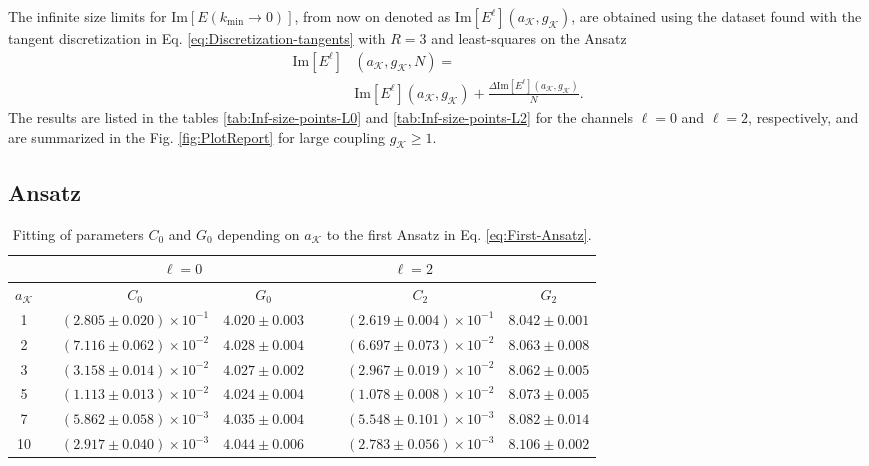 \documentclass[english,aps,prd,nofootinbib,twocolumn]{revtex4-1}
\begin{document}
The infinite size limits for $\mathrm{Im}[E(k_{\mathrm{min}}\rightarrow 0)]$, from now on denoted as $\mathrm{Im}[E^{\ell}](a_{\mathcal{K}},g_{\mathcal{K}})$, are obtained using the dataset found with the tangent discretization in Eq. \eqref{eq:Discretization-tangents} with $R=3$ and least-squares on the Ansatz 
\begin{equation}
\label{eq:Zero-Ansatz}
\begin{split}
\mathrm{Im}[E^{\ell}]&(a_{\mathcal{K}},g_{\mathcal{K}},N) = \\ 
&\mathrm{Im}[E^{\ell}](a_{\mathcal{K}},g_{\mathcal{K}}) + \frac{\Delta\mathrm{Im}[E^{\ell}](a_{\mathcal{K}},g_{\mathcal{K}})}{N}.
\end{split}
\end{equation}
The results are listed in the tables \ref{tab:Inf-size-points-L0} and \ref{tab:Inf-size-points-L2} for the channels $\ell=0$ and $\ell=2$, respectively, and are summarized in the Fig. \ref{fig:PlotReport} for large coupling $g_{\mathcal{K}}\geq 1$.

\subsection{Ansatz}
\begin{table}
\centering 
\begin{tabular}{cccccccc}
&&
\multicolumn{2}{c}{$\ell=0$} &&
\multicolumn{2}{c}{$\ell=2$}\\	\hline	\hline 
$a_{\mathcal{K}}$	&&	
$C_{0}$	&	$G_{0}$ &&&
$C_{2}$	&	$G_{2}$	\\	\hline	\hline 
1	&&	
$(2.805\pm 0.020)\times 10^{-1}$	&
$ 4.020\pm 0.003$ &&&
$(2.619\pm 0.004)\times 10^{-1}$	&
$ 8.042\pm 0.001$\\
2	&&	
$(7.116\pm 0.062)\times 10^{-2}$	&
$ 4.028\pm 0.004$ &&&
$(6.697\pm 0.073)\times 10^{-2}$	&
$ 8.063\pm 0.008$\\
3	&&	
$(3.158\pm 0.014)\times 10^{-2}$	&
$ 4.027\pm 0.002$ &&&
$(2.967\pm 0.019)\times 10^{-2}$	&
$ 8.062\pm 0.005$\\
5	&&	
$(1.113\pm 0.013)\times 10^{-2}$	&
$ 4.024\pm 0.004$ &&&
$(1.078\pm 0.008)\times 10^{-2}$	&
$ 8.073\pm 0.005$\\
7	&&	
$(5.862\pm 0.058)\times 10^{-3}$	&
$ 4.035\pm 0.004$ &&&
$(5.548\pm 0.101)\times 10^{-3}$	&
$ 8.082\pm 0.014$\\
10	&&	
$(2.917\pm 0.040)\times 10^{-3}$	&
$ 4.044\pm 0.006$ &&&
$(2.783\pm 0.056)\times 10^{-3}$	&
$ 8.106\pm 0.002$
\end{tabular}
\caption{Fitting of parameters $C_{0}$ and $G_{0}$ depending on $a_{\mathcal{K}}$ to the first Ansatz in Eq. \eqref{eq:First-Ansatz}. }
\label{tab:First-Ansatz}
\end{table}
\end{document}
